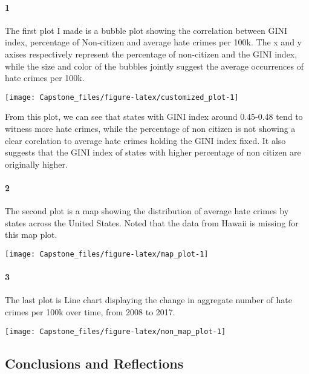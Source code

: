 \documentclass[]{article}
\let\oldparagraph\paragraph
\renewcommand{\paragraph}[1]{\oldparagraph{#1}\mbox{}}
\begin{document}
\hypertarget{section}{%
\paragraph{1}\label{section}}

The first plot I made is a bubble plot showing the correlation between
GINI index, percentage of Non-citizen and average hate crimes per 100k.
The x and y axises respectively represent the percentage of non-citizen
and the GINI index, while the size and color of the bubbles jointly
suggest the average occurrences of hate crimes per 100k.

\begin{center}\texttt{[image: Capstone\_files/figure-latex/customized\_plot-1]} \end{center}

From this plot, we can see that states with GINI index around 0.45-0.48
tend to witness more hate crimes, while the percentage of non citizen is
not showing a clear corelation to average hate crimes holding the GINI
index fixed. It also suggests that the GINI index of states with higher
percentage of non citizen are originally higher.

\hypertarget{section-1}{%
\paragraph{2}\label{section-1}}

The second plot is a map showing the distribution of average hate crimes
by states across the United States. Noted that the data from Hawaii is
missing for this map plot.

\begin{center}\texttt{[image: Capstone\_files/figure-latex/map\_plot-1]} \end{center}

\hypertarget{section-2}{%
\paragraph{3}\label{section-2}}

The last plot is Line chart displaying the change in aggregate number of
hate crimes per 100k over time, from 2008 to 2017.

\begin{center}\texttt{[image: Capstone\_files/figure-latex/non\_map\_plot-1]} \end{center}

\hypertarget{conclusions-and-reflections}{%
\subsection{Conclusions and
Reflections}\label{conclusions-and-reflections}}
\end{document}

